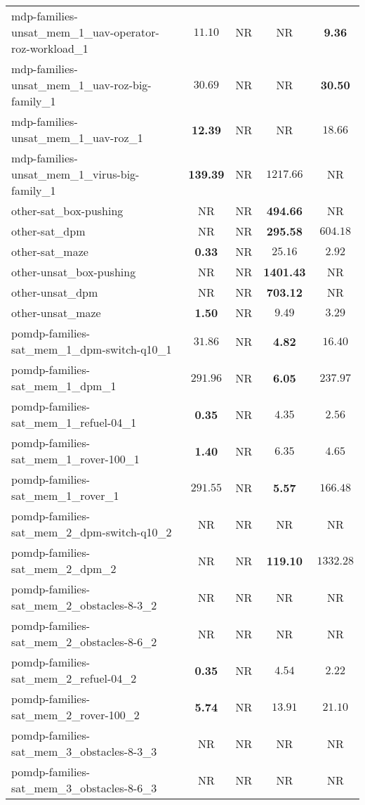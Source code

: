 \begin{tabular}{lcccc}
mdp-families-unsat\_mem\_1\_uav-operator-roz-workload\_1 & $11.10$ & NR & NR & \textbf{9.36} \\
mdp-families-unsat\_mem\_1\_uav-roz-big-family\_1 & $30.69$ & NR & NR & \textbf{30.50} \\
mdp-families-unsat\_mem\_1\_uav-roz\_1 & \textbf{12.39} & NR & NR & $18.66$ \\
mdp-families-unsat\_mem\_1\_virus-big-family\_1 & \textbf{139.39} & NR & $1217.66$ & NR \\
other-sat\_box-pushing & NR & NR & \textbf{494.66} & NR \\
other-sat\_dpm & NR & NR & \textbf{295.58} & $604.18$ \\
other-sat\_maze & \textbf{0.33} & NR & $25.16$ & $2.92$ \\
other-unsat\_box-pushing & NR & NR & \textbf{1401.43} & NR \\
other-unsat\_dpm & NR & NR & \textbf{703.12} & NR \\
other-unsat\_maze & \textbf{1.50} & NR & $9.49$ & $3.29$ \\
pomdp-families-sat\_mem\_1\_dpm-switch-q10\_1 & $31.86$ & NR & \textbf{4.82} & $16.40$ \\
pomdp-families-sat\_mem\_1\_dpm\_1 & $291.96$ & NR & \textbf{6.05} & $237.97$ \\
pomdp-families-sat\_mem\_1\_refuel-04\_1 & \textbf{0.35} & NR & $4.35$ & $2.56$ \\
pomdp-families-sat\_mem\_1\_rover-100\_1 & \textbf{1.40} & NR & $6.35$ & $4.65$ \\
pomdp-families-sat\_mem\_1\_rover\_1 & $291.55$ & NR & \textbf{5.57} & $166.48$ \\
pomdp-families-sat\_mem\_2\_dpm-switch-q10\_2 & NR & NR & NR & NR \\
pomdp-families-sat\_mem\_2\_dpm\_2 & NR & NR & \textbf{119.10} & $1332.28$ \\
pomdp-families-sat\_mem\_2\_obstacles-8-3\_2 & NR & NR & NR & NR \\
pomdp-families-sat\_mem\_2\_obstacles-8-6\_2 & NR & NR & NR & NR \\
pomdp-families-sat\_mem\_2\_refuel-04\_2 & \textbf{0.35} & NR & $4.54$ & $2.22$ \\
pomdp-families-sat\_mem\_2\_rover-100\_2 & \textbf{5.74} & NR & $13.91$ & $21.10$ \\
pomdp-families-sat\_mem\_3\_obstacles-8-3\_3 & NR & NR & NR & NR \\
pomdp-families-sat\_mem\_3\_obstacles-8-6\_3 & NR & NR & NR & NR \\

\end{tabular}
